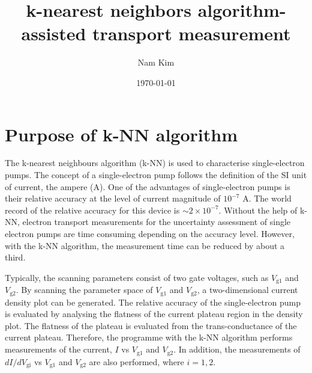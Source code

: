 \documentclass[jkps,preprint,fleqn,showpacs,showkeys]{revtex4}
\begin{document}



\title[]{k-nearest neighbors algorithm-assisted transport measurement}
\author{Nam Kim}

\date{\today}

\maketitle


\section{Purpose of k-NN algorithm}

The k-nearest neighbours algorithm (k-NN) is used to characterise single-electron pumps.
The concept of a single-electron pump follows the definition of the SI unit of current, the ampere (A)\cite{ampere}.  
One of the advantages of single-electron pumps is their relative accuracy at the level of current magnitude of $10^{-7}$ A. 
The world record of the relative accuracy for this device\cite{stein} is $\sim 2\times 10^{-7}$.
Without the help of k-NN, electron transport measurements for the uncertainty assessment of single electron pumps are time consuming depending on the accuracy level.
However, with the k-NN algorithm, the measurement time can be reduced by about a third.

Typically, the scanning parameters consist of two gate voltages, such as $V_\text{g1}$ and $V_\text{g2}$.
By scanning the parameter space of $V_\text{g1}$ and $V_\text{g2}$, a two-dimensional current density plot can be generated.
The relative accuracy of the single-electron pump is evaluated by analysing the flatness of the current plateau region in the density plot.
The flatness of the plateau is evaluated from the trans-conductance of the current plateau.
Therefore, the programme with the k-NN algorithm performs measurements of the current, $I$ vs $V_\text{g1}$ and $V_\text{g2}$.
 In addition, the measurements of $dI/dV_\text{gi}$ vs $V_\text{g1}$ and $V_\text{g2}$ are also performed,
where $i=1,2$.
\end{document}
